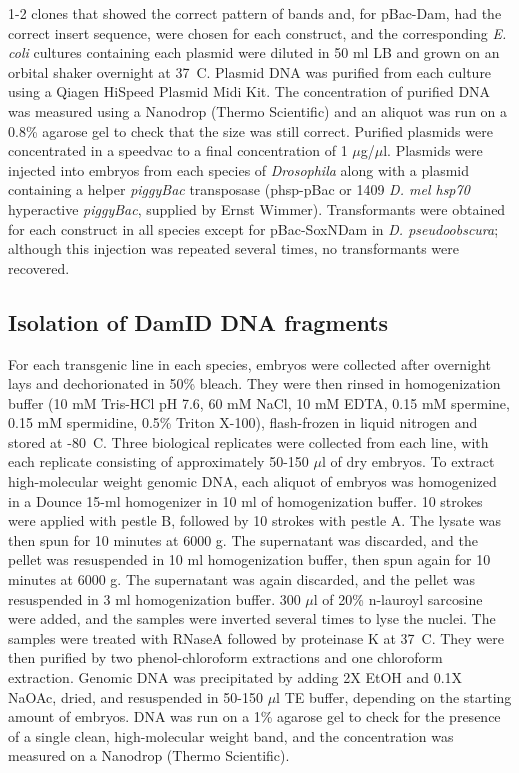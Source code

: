 1-2 clones that showed the correct pattern of bands and, for pBac-Dam, had the correct insert sequence, were chosen for each construct, and the corresponding \emph{E. coli} cultures containing each plasmid were diluted in 50 ml LB and grown on an orbital shaker overnight at 37\degree~C. Plasmid DNA was purified from each culture using a Qiagen HiSpeed Plasmid Midi Kit. The concentration of purified DNA was measured using a Nanodrop (Thermo Scientific) and an aliquot was run on a 0.8\% agarose gel to check that the size was still correct. Purified plasmids were concentrated in a speedvac to a final concentration of 1 \(\mu\)g/\(\mu\)l. Plasmids were injected into embryos from each species of \emph{Drosophila} along with a plasmid containing a helper \emph{piggyBac} transposase (phsp-pBac or 1409 \emph{D. mel hsp70} hyperactive \emph{piggyBac}, supplied by Ernst Wimmer). Transformants were obtained for each construct in all species except for pBac-SoxNDam in \emph{D. pseudoobscura}; although this injection was repeated several times, no transformants were recovered.

\subsection{Isolation of DamID DNA fragments}
For each transgenic line in each species, embryos were collected after overnight lays and dechorionated in 50\% bleach. They were then rinsed in homogenization buffer (10 mM Tris-HCl pH 7.6, 60 mM NaCl, 10 mM EDTA, 0.15 mM spermine, 0.15 mM spermidine, 0.5\% Triton X-100), flash-frozen in liquid nitrogen and stored at -80\degree~C. Three biological replicates were collected from each line, with each replicate consisting of approximately 50-150 \(\mu\)l of dry embryos. To extract high-molecular weight genomic DNA, each aliquot of embryos was homogenized in a Dounce 15-ml homogenizer in 10 ml of homogenization buffer. 10 strokes were applied with pestle B, followed by 10 strokes with pestle A. The lysate was then spun for 10 minutes at 6000 g. The supernatant was discarded, and the pellet was resuspended in 10 ml homogenization buffer, then spun again for 10 minutes at 6000 g. The supernatant was again discarded, and the pellet was resuspended in 3 ml homogenization buffer. 300 \(\mu\)l of 20\% n-lauroyl sarcosine were added, and the samples were inverted several times to lyse the nuclei. The samples were treated with RNaseA followed by proteinase K at 37\degree~C. They were then purified by two phenol-chloroform extractions and one chloroform extraction. Genomic DNA was precipitated by adding 2X EtOH and 0.1X NaOAc, dried, and resuspended in 50-150 \(\mu\)l TE buffer, depending on the starting amount of embryos. DNA was run on a 1\% agarose gel to check for the presence of a single clean, high-molecular weight band, and the concentration was measured on a Nanodrop (Thermo Scientific).

